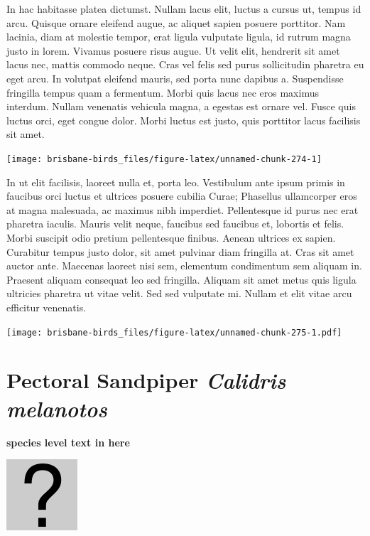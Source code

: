 \documentclass[]{book}
\let\origfigure\figure
\let\endorigfigure\endfigure
\renewenvironment{figure}[1][2] {
  \expandafter\origfigure\expandafter[H]
} {
  \endorigfigure
}
\begin{document}
In hac habitasse platea dictumst. Nullam lacus elit, luctus a cursus ut,
tempus id arcu. Quisque ornare eleifend augue, ac aliquet sapien posuere
porttitor. Nam lacinia, diam at molestie tempor, erat ligula vulputate
ligula, id rutrum magna justo in lorem. Vivamus posuere risus augue. Ut
velit elit, hendrerit sit amet lacus nec, mattis commodo neque. Cras vel
felis sed purus sollicitudin pharetra eu eget arcu. In volutpat eleifend
mauris, sed porta nunc dapibus a. Suspendisse fringilla tempus quam a
fermentum. Morbi quis lacus nec eros maximus interdum. Nullam venenatis
vehicula magna, a egestas est ornare vel. Fusce quis luctus orci, eget
congue dolor. Morbi luctus est justo, quis porttitor lacus facilisis sit
amet.

\begin{figure}
\texttt{[image: brisbane-birds\_files/figure-latex/unnamed-chunk-274-1]} \caption{insert figure caption}\label{fig:unnamed-chunk-274}
\end{figure}

In ut elit facilisis, laoreet nulla et, porta leo. Vestibulum ante ipsum
primis in faucibus orci luctus et ultrices posuere cubilia Curae;
Phasellus ullamcorper eros at magna malesuada, ac maximus nibh
imperdiet. Pellentesque id purus nec erat pharetra iaculis. Mauris velit
neque, faucibus sed faucibus et, lobortis et felis. Morbi suscipit odio
pretium pellentesque finibus. Aenean ultrices ex sapien. Curabitur
tempus justo dolor, sit amet pulvinar diam fringilla at. Cras sit amet
auctor ante. Maecenas laoreet nisi sem, elementum condimentum sem
aliquam in. Praesent aliquam consequat leo sed fringilla. Aliquam sit
amet metus quis ligula ultricies pharetra ut vitae velit. Sed sed
vulputate mi. Nullam et elit vitae arcu efficitur venenatis.

\begin{figure}
\centering
\texttt{[image: brisbane-birds\_files/figure-latex/unnamed-chunk-275-1.pdf]}
\caption{\label{fig:unnamed-chunk-275}insert figure caption}
\end{figure}

\section{\texorpdfstring{Pectoral Sandpiper \emph{Calidris
melanotos}}{Pectoral Sandpiper Calidris melanotos}}\label{pectoral-sandpiper-calidris-melanotos}

\textbf{species level text in here}

\begin{figure}
\centering
\includegraphics{assets/missing.png}
\caption{No image for species}
\end{figure}
\end{document}
